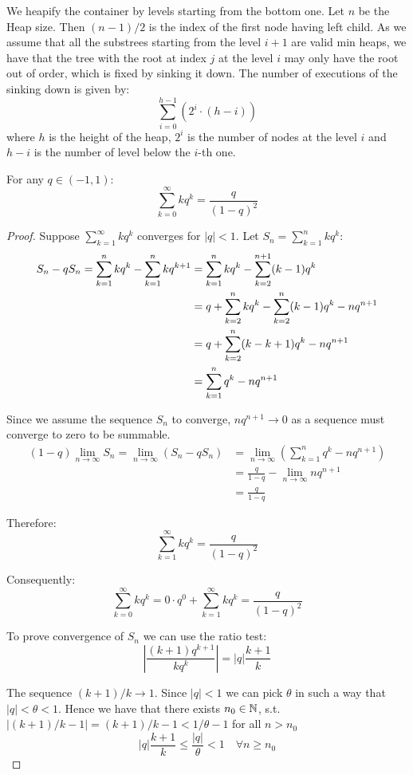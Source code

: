 We heapify the container by levels starting from the bottom one. Let $n$ be the Heap size. Then $(n - 1) / 2$ is the index of the first node having left child. As we assume that all the substrees starting from the level $i + 1$ are valid min heaps, we have that the tree with the root at index $j$ at the level $i$ may only have the root out of order, which is fixed by sinking it down. The number of executions of the sinking down is given by:
\[\sum_{i=0}^{h-1} (2^i \cdot (h - i))\]
where $h$ is the height of the heap, $2^i$ is the number of nodes at the level $i$ and $h - i$ is the number of level below the $i$-th one.

\begin{lemma}
    For any $q \in (-1, 1)$:
    \[\sum_{k=0}^{\infty} k q^k = \frac{q}{(1 - q)^2}\]
\end{lemma}
\begin{proof}
    Suppose $\sum_{k=1}^{\infty} k {q}^k$ converges for $|q| < 1$. Let $S_n = \sum_{k=1}^{n} k {q}^k$:
    \begin{align}
        S_n - qS_n
        = \sum_{k=1}^{n} k {q}^k - \sum_{k=1}^{n} k q^{k+1}
         & = \sum_{k=1}^{n} k {q}^k - \sum_{k=2}^{n+1} (k-1) q^k \notag
        \\ &= q + \sum_{k=2}^{n} k {q}^k - \sum_{k=2}^{n} (k-1) q^k - nq^{n+1} \notag
        \\ &= q + \sum_{k=2}^{n} (k - k + 1) q^k - nq^{n+1} \notag
        \\ &= \sum_{k=1}^{n} q^k - nq^{n+1} \notag
    \end{align}

    Since we assume the sequence $S_n$ to converge, $nq^{n+1} \to 0$ as a sequence must converge to zero to be summable.
    \begin{align*}
        (1-q)\lim_{n \to \infty} S_n
        = \lim_{n \to \infty} (S_n - qS_n)
         & = \lim_{n \to \infty} \left(\sum_{k=1}^{n} q^k - nq^{n+1} \right)
        \\ &= \frac{q}{1-q} - \lim_{n \to \infty} nq^{n+1}
        \\ &= \frac{q}{1-q}
    \end{align*}

    Therefore:
    \[\sum_{k=1}^{\infty} k {q}^k = \frac{q}{{(1-q)}^2}\]

    Consequently:
    \[\sum_{k=0}^{\infty} k q^k
    = 0 \cdot q^0 + \sum_{k=1}^{\infty} k q^k
    = \frac{q}{(1 - q)^2}\]

    To prove convergence of $S_n$ we can use the ratio test:
    \[\left|\frac{(k+1)q^{k+1}}{kq^k} \right|
        = |q|\frac{k+1}{k}\]

    The sequence $(k+1)/k \to 1$. Since $|q| < 1$ we can pick $\theta$ in such a way that $|q| < \theta < 1$. Hence we have that there exists $n_0 \in \mathbb{N}$, s.t. $|(k+1)/k - 1| = (k+1)/k - 1 < 1 / \theta - 1$ for all $n > n_0$
    \[|q|\frac{k+1}{k} \leq \frac{|q|}{\theta} < 1 \quad \forall n\geq n_0\]
\end{proof}

